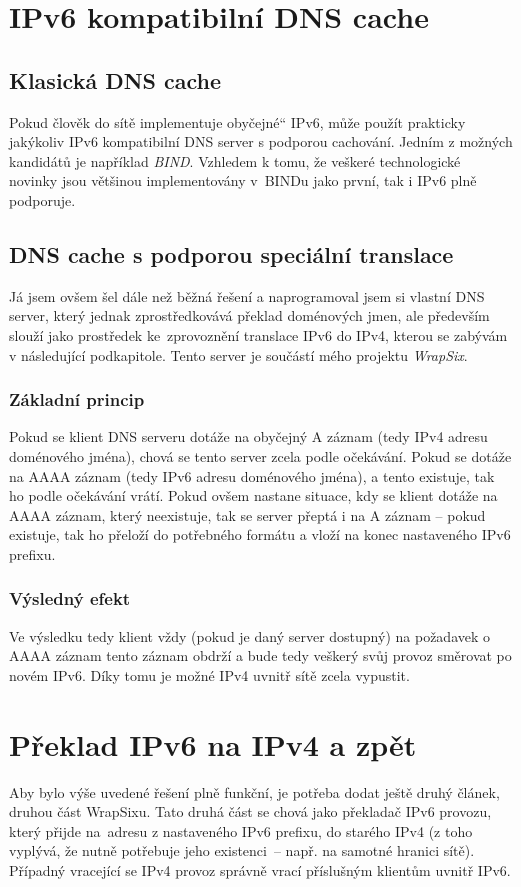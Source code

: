 \documentclass[12pt]{report}
\newcommand\uv[1]{\quotedblbase #1\textquotedblleft}
\begin{document}
\section{IPv6 kompatibilní DNS cache}
\subsection{Klasická DNS cache}
Pokud člověk do sítě implementuje \uv{obyčejné} IPv6, může použít prakticky jakýkoliv IPv6 kompatibilní DNS server s podporou cachování. Jedním z možných kandidátů je například \textit{BIND}. Vzhledem k tomu, že veškeré technologické novinky jsou většinou implementovány v~BINDu jako první, tak i IPv6 plně podporuje.

\subsection{DNS cache s podporou speciální translace}
Já jsem ovšem šel dále než běžná řešení a naprogramoval jsem si vlastní DNS server, který jednak zprostředkovává překlad doménových jmen, ale především slouží jako prostředek ke~zprovoznění translace IPv6 do IPv4, kterou se zabývám v následující podkapitole. Tento server je součástí mého projektu \textit{WrapSix}.

\subsubsection{Základní princip}
Pokud se klient DNS serveru dotáže na obyčejný A záznam (tedy IPv4 adresu doménového jména), chová se tento server zcela podle očekávání. Pokud se dotáže na AAAA záznam (tedy IPv6 adresu doménového jména), a tento existuje, tak ho podle očekávání vrátí. Pokud ovšem nastane situace, kdy se klient dotáže na AAAA záznam, který neexistuje, tak se server přeptá i na A záznam -- pokud existuje, tak ho přeloží do potřebného formátu a vloží na konec nastaveného IPv6 prefixu.

\subsubsection{Výsledný efekt}
Ve výsledku tedy klient vždy (pokud je daný server dostupný) na požadavek o AAAA záznam tento záznam obdrží a bude tedy veškerý svůj provoz směrovat po novém IPv6. Díky tomu je možné IPv4 uvnitř sítě zcela vypustit.

\section{Překlad IPv6 na IPv4 a zpět}
Aby bylo výše uvedené řešení plně funkční, je potřeba dodat ještě druhý článek, druhou část WrapSixu. Tato druhá část se chová jako překladač IPv6 provozu, který přijde na~adresu z nastaveného IPv6 prefixu, do starého IPv4 (z toho vyplývá, že nutně potřebuje jeho existenci~-- např. na samotné hranici sítě). Případný vracející se IPv4 provoz správně vrací příslušným klientům uvnitř IPv6.
\end{document}
